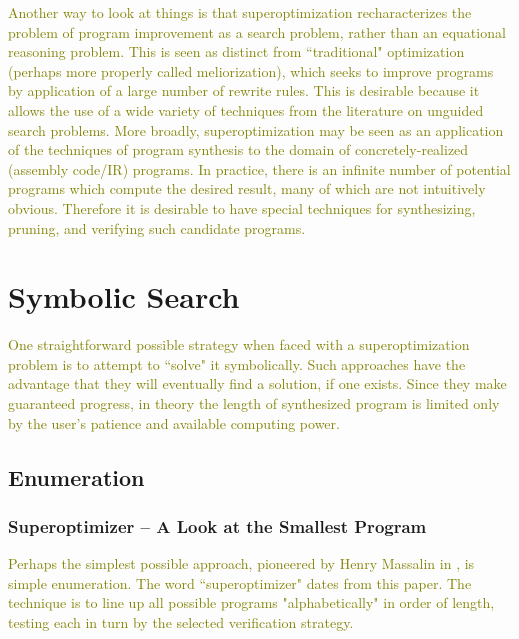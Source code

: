 \documentclass[12pt,twoside]{reedthesis}
\newcommand{\red}[1]{\textcolor{red}{#1}}
\newcommand{\green}[1]{\textcolor{olive}{#1}}
\begin{document}
    \green{
    Another way to look at things is that superoptimization recharacterizes the problem of program improvement as a search problem, rather than an equational reasoning problem.
    This is seen as distinct from ``traditional" optimization (perhaps more properly called meliorization), which seeks to improve programs by application of a large number of rewrite rules.
    This is desirable because it allows the use of a wide variety of techniques from the literature on unguided search problems.
    More broadly, superoptimization may be seen as an application of the techniques of program synthesis to the domain of concretely-realized (assembly code/IR) programs.
    In practice, there is an infinite number of potential programs which compute the desired result, many of which are not intuitively obvious.
    Therefore it is desirable to have special techniques for synthesizing, pruning, and verifying such candidate programs. 
    }

\chapter{Symbolic Search}
    \green{
    One straightforward possible strategy when faced with a superoptimization problem is to attempt to ``solve" it symbolically. 
    Such approaches have the advantage that they will eventually find a solution, if one exists.
    Since they make guaranteed progress, in theory the length of synthesized program is limited only by the user's patience and available computing power.
    }
    
    \section{Enumeration}
        \subsection{Superoptimizer -- A Look at the Smallest Program}
            \green{
            Perhaps the simplest possible approach, pioneered by Henry Massalin in \cite{massalin1987superoptimizer}, is simple enumeration. 
            The word ``superoptimizer" dates from this paper.
            The technique is to line up all possible programs "alphabetically" in order of length, testing each in turn by the selected verification strategy. 
            }
                
\end{document}

